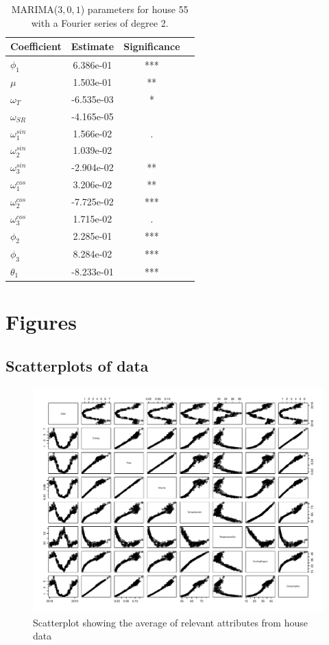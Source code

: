      \begin{table}[H]
        \centering
        \begin{tabular}{l|ccc}
        \hline
        Coefficient & Estimate & Significance\\ \hline \hline
        $\phi_1$ & 6.386e-01 & *** \\
        $\mu$ & 1.503e-01 & ** \\
        $\omega_{T}$ & -6.535e-03 & * \\
        $\omega_{SR}$ & -4.165e-05 &  \\
        $\omega^{sin}_1$ & 1.566e-02 & . \\
        $\omega^{sin}_2$ & 1.039e-02 & \\
        $\omega^{sin}_3$ & -2.904e-02 & **\\
        $\omega^{cos}_1$ & 3.206e-02 & ** \\
        $\omega^{cos}_2$ & -7.725e-02 & *** \\
        $\omega^{cos}_3$ & 1.715e-02 & . \\
        $\phi_2$ & 2.285e-01 & *** \\
        $\phi_3$ & 8.284e-02 & *** \\
        $\theta_1$ & -8.233e-01 & *** \\
        \hline
        \end{tabular}
        \caption{MARIMA($3,0,1$) parameters for house 55 with a Fourier series of degree 2.}
        \label{tab: MARIMAparam55_fourier}
     \end{table}
    

\chapter{Figures}
\section{Scatterplots of data}
\begin{figure}[H]
    \centering
    \includegraphics[width=1.3\textwidth, angle = 90 ]{../../../figures/house_attri.pdf}
    \caption{Scatterplot showing the average of relevant attributes from house data}
    \label{fig: house_attri}
\end{figure}

